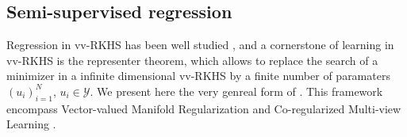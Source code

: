 \subsection{Semi-supervised regression}
Regression in \acl{vv-RKHS} has been well studied \citep{Alvarez2012, Minh_icml13,minh2016unifying,sangnier2016joint,kadri2015operator,Micchelli2005,Brouard2016_jmlr}, and a cornerstone of learning in \acs{vv-RKHS} is the representer theorem, which allows to replace the search of a minimizer in a infinite dimensional \acs{vv-RKHS} by a finite number of paramaters $(u_i)_{i=1}^N$, $u_i\in\mathcal{Y}$. We present here the very genreal form of \citet{minh2016unifying}. This framework encompass Vector-valued Manifold Regularization \citep{belkin2006manifold,Brouard2011,minh2013unifying} and Co-regularized Multi-view Learning \citep{brefeld2006efficient,sindhwani2008rkhs,rosenberg2009kernel,sun2011multi}.
